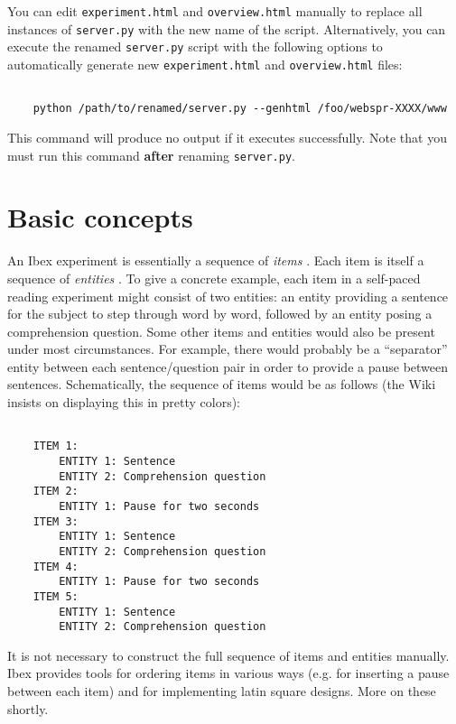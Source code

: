 \documentclass[11pt,letterpaper]{article}
\begin{document}
You can edit \texttt{experiment.html} and \texttt{overview.html} manually to replace all instances of \texttt{server.py}
with the new name of the script. Alternatively, you can execute the renamed \texttt{server.py} script with the following options
to automatically generate new \texttt{experiment.html} and \texttt{overview.html} files:
\footnotesize\begin{verbatim}

    python /path/to/renamed/server.py --genhtml /foo/webspr-XXXX/www
\end{verbatim}

\smallskip\noindent\normalsize

This command will produce no output if it executes successfully. Note that you must run this command \textbf{after}
renaming \texttt{server.py}.

\section{Basic concepts}

An Ibex experiment is essentially a sequence of\textit{ items} .
Each item is itself a sequence of\textit{ entities} . To give a concrete example, each
item in a self-paced reading experiment might consist of two entities: an
entity providing a sentence for the subject to step through word by word,
followed by an entity posing a comprehension question. Some other items and
entities would also be present under most circumstances. For example, there
would probably be a ``separator'' entity between each sentence/question pair in
order to provide a pause between sentences. Schematically, the sequence of
items would be as follows (the Wiki insists on displaying this in pretty
colors):
\footnotesize\begin{verbatim}

    ITEM 1:
        ENTITY 1: Sentence
        ENTITY 2: Comprehension question
    ITEM 2:
        ENTITY 1: Pause for two seconds
    ITEM 3:
        ENTITY 1: Sentence
        ENTITY 2: Comprehension question
    ITEM 4:
        ENTITY 1: Pause for two seconds
    ITEM 5:
        ENTITY 1: Sentence
        ENTITY 2: Comprehension question
\end{verbatim}

\smallskip\noindent\normalsize

It is not necessary to construct the full sequence of items and entities
manually. Ibex provides tools for ordering items in various ways (e.g. for
inserting a pause between each item) and for implementing latin square designs.
More on these shortly.
\end{document}
